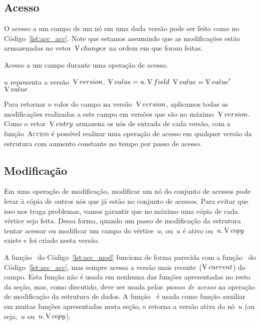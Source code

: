 \documentclass[main.tex]{subfiles}
\begin{document}
\subsection{Acesso}

O acesso a um campo de um nó em uma dada versão pode ser feito como no Código~\ref{lst:acc_acc}. Note que estamos assumindo que as modificações estão armazenadas no vetor~$\operatorname{V}{changes}$ na ordem em que foram feitas.

\begin{algorithm}
\caption{Acesso a um campo durante uma operação de acesso.} \label{lst:acc_acc}
\begin{algorithmic}[1]

\Require $u$ representa a versão~$\operatorname{V}{version}$.
	\State $\operatorname{V}{value} = u.\operatorname{V}{field}$
			\State $\operatorname{V}{value} = \operatorname{V}{value}'$
		\EndIf
	\EndFor
	\State \Return $\operatorname{V}{value}$
\EndFunction

\end{algorithmic}
\end{algorithm}

Para retornar o valor do campo na versão~$\operatorname{V}{version}$, aplicamos todas as modificações realizadas a este campo em versões que são no máximo~$\operatorname{V}{version}$. Como o vetor~$\operatorname{V}{entry}$ armazena os nós de entrada de cada versão, com a função~\textsc{Access} é possível realizar uma operação de acesso em qualquer versão da estrutura com aumento constante no tempo por passo de acesso.

\subsection{Modificação}

Em uma operação de modificação, modificar um nó do conjunto de acessos pode levar à cópia de outros nós que já estão no conjunto de acessos. Para evitar que isso nos traga problemas, vamos garantir que no máximo uma cópia de cada vértice seja feita. Dessa forma, quando um passo de modificação da estrutura tentar acessar ou modificar um campo do vértice~$u$, ou~$u$ é ativo ou~$u.\operatorname{V}{copy}$ existe e foi criado nesta versão.

A função~ do Código~\ref{lst:acc_mod} funciona de forma parecida com a função~ do Código~\ref{lst:acc_acc}, mas sempre acessa a versão mais recente~($\operatorname{V}{current}$) do campo. Esta função não é usada em nenhuma das funções apresentadas no resto da seção, mas, como discutido, deve ser usada pelos~\emph{passos de acesso} na operação de modificação da estrutura de dados. A função~ é usada como função auxiliar em muitas funções apresentadas nesta seção, e retorna a versão ativa do nó~$u$ (ou seja,~$u$ ou~$u.\operatorname{V}{copy}$).
\end{document}
